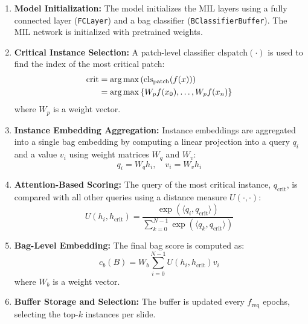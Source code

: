 \documentclass[10pt,twocolumn]{article}
\begin{document}
\begin{enumerate}
\item \textbf{Model Initialization:} The model initializes the MIL layers using a fully connected layer (\texttt{FCLayer}) and a bag classifier (\texttt{BClassifierBuffer}). The MIL network is initialized with pretrained weights.

\item \textbf{Critical Instance Selection:} A patch-level classifier $\text{clspatch}(\cdot)$ is used to find the index of the most critical patch:
\begin{align}
\text{crit} &= \arg\max \left( \text{cls}_{\text{patch}}(f(x)) \right) \notag \\ 
&= \arg\max \left\{ W_{p} f(x_{0}), \dots, W_{p} f(x_{n}) \right\}
\end{align}
where $W_p$ is a weight vector.

\item \textbf{Instance Embedding Aggregation:} Instance embeddings are aggregated into a single bag embedding by computing a linear projection into a query $q_i$ and a value $v_i$ using weight matrices $W_q$ and $W_v$:
\begin{equation}
q_i = W_q h_i, \quad v_i = W_v h_i
\end{equation}

\item \textbf{Attention-Based Scoring:} The query of the most critical instance, $q_{\text{crit}}$, is compared with all other queries using a distance measure $U(\cdot, \cdot)$:
\begin{equation}
U(h_i, h_{\text{crit}}) = \frac{\exp(\langle q_i, q_{\text{crit}} \rangle)}{\sum_{k=0}^{N-1} \exp(\langle q_k, q_{\text{crit}} \rangle)}
\end{equation}

\item \textbf{Bag-Level Embedding:} The final bag score is computed as:
\begin{equation}
c_b(B) = W_b \sum_{i=0}^{N-1} U(h_i, h_{\text{crit}}) v_i
\end{equation}
where $W_b$ is a weight vector.

\item \textbf{Buffer Storage and Selection:} The buffer is updated every $f_{\text{req}}$ epochs, selecting the top-$k$ instances per slide.


\end{enumerate}
\end{document}
